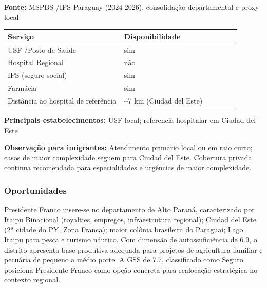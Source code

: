 \textbf{Fonte:} MSPBS /\allowbreak  IPS Paraguay (2024-2026), consolidação
departamental e proxy local

{\def\LTcaptype{none} %
\begin{longtable}{@{}>{\raggedright\arraybackslash}p{0.45\linewidth} >{\raggedright\arraybackslash}p{0.45\linewidth}@{}}
\toprule\noalign{}
Serviço & Disponibilidade \\
\midrule\noalign{}
\endhead
\bottomrule\noalign{}
\endlastfoot
USF /\allowbreak  Posto de Saúde & sim \\
Hospital Regional & não \\
IPS (seguro social) & sim \\
Farmácia & sim \\
Distância ao hospital de referência & \textasciitilde7 km (Ciudad del
Este) \\
\end{longtable}
}

\textbf{Principais estabelecimentos:} USF local; referencia hospitalar
em Ciudad del Este

\textbf{Observação para imigrantes:} Atendimento primario local ou em
raio curto; casos de maior complexidade seguem para Ciudad del Este.
Cobertura privada continua recomendada para especialidades e urgências
de maior complexidade.
\newpage

\subsubsection*{Oportunidades}\label{oport-presidente-franco-1002}
Presidente Franco insere-se no departamento de Alto Paraná, caracterizado por Itaipu Binacional (royalties, empregos, infraestrutura regional); Ciudad del Este (2ª cidade do PY, Zona Franca); maior colônia brasileira do Paraguai; Lago Itaipu para pesca e turismo náutico. Com dimensão de autossuficiência de 6.9, o distrito apresenta base produtiva adequada para projetos de agricultura familiar e pecuária de pequeno a médio porte. A GSS de 7.7, classificado como Seguro posiciona Presidente Franco como opção concreta para realocação estratégica no contexto regional.


